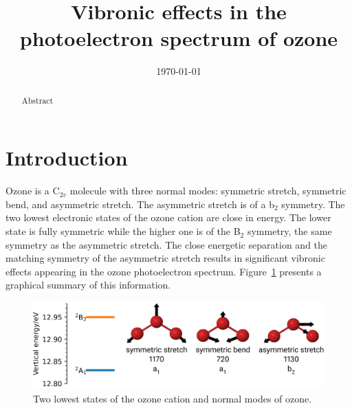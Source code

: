 \documentclass[12pt,prb,aps]{revtex4-2}
\begin{document}
\title{Vibronic effects in the photoelectron spectrum of ozone}


\date{\today}

\begin{abstract}Abstract\end{abstract}


\maketitle

\section{Introduction}

Ozone is a C$_{2v}$ molecule with three normal modes: symmetric stretch,
symmetric bend, and asymmetric stretch. The asymmetric stretch is of a b$_2$
symmetry. The two lowest electronic states of the ozone cation are close in
energy. The lower state is fully symmetric while the higher one is of the
B$_2$ symmetry, the same symmetry as the asymmetric stretch. The close
energetic separation and the matching symmetry of the asymmetric stretch
results in significant vibronic effects appearing in the ozone photoelectron
spectrum. Figure~\ref{fig:ozone_intro} presents a graphical summary of this
information.

\begin{figure}
    \includegraphics[width = 16 cm]{./figures/ozone_intro}
    \caption{ 
        Two lowest states of the ozone cation and normal modes of ozone.
    }
    \label{fig:ozone_intro}
\end{figure}
\end{document}

